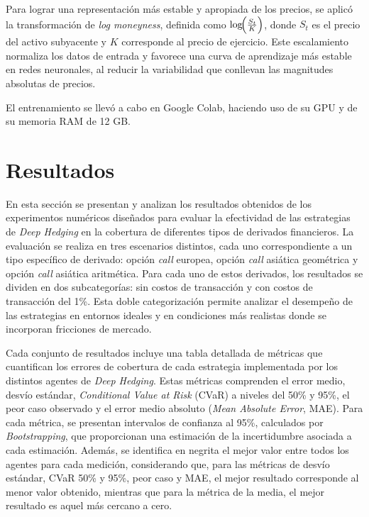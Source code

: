 \documentclass[11pt,a4paper,spanish]{article}
\numberwithin{equation}{section} %
\begin{document}
Para lograr una representación más estable y apropiada de los precios, se aplicó la transformación de \emph{log moneyness}, definida como $\log\!\Bigl(\frac{S_t}{K}\Bigr)$, donde \(S_t\) es el precio del activo subyacente y \(K\) corresponde al precio de ejercicio. Este escalamiento normaliza los datos de entrada y favorece una curva de aprendizaje más estable en redes neuronales, al reducir la variabilidad que conllevan las magnitudes absolutas de precios.

El entrenamiento se llevó a cabo en Google Colab, haciendo uso de su GPU y de su memoria RAM de 12 GB.

\newpage

\section{Resultados}\label{sec:resultados}

En esta sección se presentan y analizan los resultados obtenidos de los experimentos numéricos diseñados para evaluar la efectividad de las estrategias de \textit{Deep Hedging} en la cobertura de diferentes tipos de derivados financieros. La evaluación se realiza en tres escenarios distintos, cada uno correspondiente a un tipo específico de derivado: opción \textit{call} europea, opción \textit{call} asiática geométrica y opción \textit{call} asiática aritmética. Para cada uno de estos derivados, los resultados se dividen en dos subcategorías: sin costos de transacción y con costos de transacción del 1\%. Esta doble categorización permite analizar el desempeño de las estrategias en entornos ideales y en condiciones más realistas donde se incorporan fricciones de mercado.

Cada conjunto de resultados incluye una tabla detallada de métricas que cuantifican los errores de cobertura de cada estrategia implementada por los distintos agentes de \textit{Deep Hedging}. Estas métricas comprenden el error medio, desvío estándar, \textit{Conditional Value at Risk} (CVaR) a niveles del 50\% y 95\%, el peor caso observado y el error medio absoluto (\textit{Mean Absolute Error}, MAE). Para cada métrica, se presentan intervalos de confianza al 95\%, calculados por \textit{Bootstrapping}, que proporcionan una estimación de la incertidumbre asociada a cada estimación. Además, se identifica en negrita el mejor valor entre todos los agentes para cada medición, considerando que, para las métricas de desvío estándar, CVaR 50\% y 95\%, peor caso y MAE, el mejor resultado corresponde al menor valor obtenido, mientras que para la métrica de la media, el mejor resultado es aquel más cercano a cero.
\end{document}
